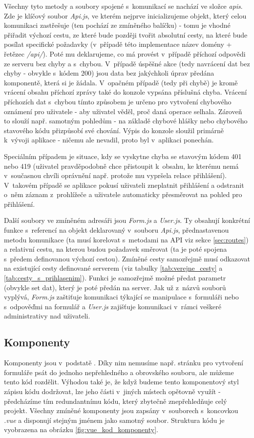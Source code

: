 	Všechny tyto metody a soubory spojené s~komunikací se nachází ve složce \textit{apis}. Zde je klíčový soubor \textit{Api.js}, ve kterém nejprve inicializujeme objekt, který celou komunikaci zastřešuje (ten pochází ze zmíněného balíčku) - tomu je vhodné přiřadit výchozí cestu, ze které bude později tvořit absolutní cesty, na které bude posílat specifické požadavky (v~případě této implementace název domény + řetězec \textit{/api/}). Poté mu deklarujeme, co má provést v~případě příchozí odpovědi ze serveru bez chyby a s~chybou. V~případě úspěšné akce (tedy navrácení dat bez chyby - obvykle s~kódem 200) jsou data bez jakýchkoli úprav předána komponentě, která si je žádala. V~opačném případě (tedy při chybě) je kromě vrácení obsahu příchozí zprávy také do konzole vypsána příslušná chyba. Vrácení příchozích dat s~chybou tímto způsobem je určeno pro vytvoření chybového oznámení pro uživatele - aby uživatel věděl, proč daná operace selhala. Zároveň to slouží např. samotným pohledům - na základě chybové hlášky nebo chybového stavového kódu přizpůsobí své chování. Výpis do konzole sloužil primárně k~vývoji aplikace - ničemu ale nevadil, proto byl v~aplikaci ponechán. 
	
	Speciálním případem je situace, kdy se vyskytne chyba se stavovým kódem 401 nebo 419 (uživatel pravděpodobně chce přistoupit k~obsahu, ke kterému nemá v~současnou chvíli oprávnění např. protože mu vypršela relace přihlášení). V~takovém případě se aplikace pokusí uživateli zneplatnit přihlášení a odstranit o~něm záznam z~prohlížeče a uživatele automaticky přesměrovat na pohled pro přihlášení.
	
	Další soubory ve zmíněném adresáři jsou \textit{Form.js} a \textit{User.js}. Ty obsahují konkrétní funkce s~referencí na objekt deklarovaný v~souboru \textit{Api.js}, přednastavenou metodu komunikace (ta musí korelovat s~metodami na API viz sekce \ref{sec:routes}) a relativní cestu, na kterou budou požadavek směrovat (ta je poté spojena s~předem definovanou výchozí cestou). Zmíněné cesty samozřejmě musí odkazovat na existující cesty definované serverem (viz tabulky \ref{tab:verejne_cesty} a \ref{tab:cesty_s_prihlasenim}). Funkci je samozřejmě možné předat parametr (obvykle set dat), který je poté předán na server. Jak už z~názvů souborů vyplývá, \textit{Form.js} zaštiťuje komunikaci týkající se manipulace s~formuláři nebo s~odpověďmi na formulář a \textit{User.js} zajišťuje komunikaci v~rámci veškeré administrativy nad uživateli.
	
	\subsection{Komponenty}\label{sec:komponenty}
	Komponenty jsou v~podstatě . Díky nim nemusíme např. stránku pro vytvoření formuláře psát do jednoho nepřehledného a obrovského souboru, ale můžeme tento kód rozdělit. Výhodou také je, že když budeme tento komponentový styl zápisu kódu dodržovat, lze jeho části v~jiných místech opětovně využít - předcházíme tím redundantnímu kódu, který zbytečně znepřehledňuje celý projekt. Všechny zmíněné komponenty jsou zapsány v~souborech s~koncovkou \textit{.vue} a disponují stejným jménem jako samotný soubor. Struktura kódu je vyobrazena na obrázku \ref{fig:vue_kod_komponenty}.
	
